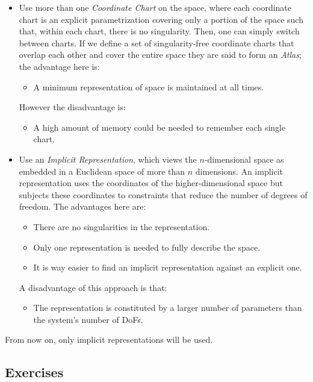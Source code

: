         \begin{itemize}
            \item Use more than one \textit{Coordinate Chart} on the space, where each coordinate chart is an explicit parametrization covering only a portion of the space such that, within each chart, there is no singularity. Then, one can simply switch between charts. If we define a set of singularity-free coordinate charts that overlap each other and cover the entire space they are said to form an \textit{Atlas}; the advantage here is:
            \begin{itemize}
                \item A minimum representation of space is maintained at all times.
            \end{itemize} 
            However the disadvantage is:
            \begin{itemize}
                \item A high amount of memory could be needed to remember each single chart.
            \end{itemize}
            \item Use an \textit{Implicit Representation}, which views the $n$-dimensional space as embedded in a Euclidean space of more than $n$ dimensions.  An implicit representation uses the coordinates of the higher-dimensional space but subjects these coordinates to constraints that reduce the number of degrees of freedom. The advantages here are:
            \begin{itemize}
                \item There are no singularities in the representation.
                \item Only one representation is needed to fully describe the space.
                \item It is way easier to find an implicit representation against an explicit one.
            \end{itemize}
            A disadvantage of this approach is that:
            \begin{itemize}
                \item The representation is constituted by a larger number of parameters than the system's number of DoFs.
            \end{itemize}
        \end{itemize}
        From now on, only implicit representations will be used.
\subsection{Exercises}
